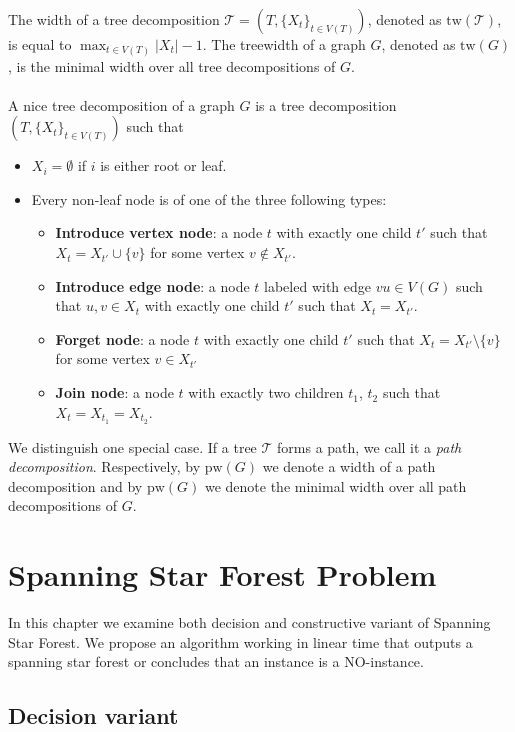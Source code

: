 \documentclass[en]{pracamgr}
\theoremstyle{definition}
\newcommand{\ssf}{spanning star forest}
\newcommand{\ssfp}{{\sc Spanning Star Forest}}
\begin{document}
The width of a tree decomposition $\mathcal{T} = (T,\{X_t\}_{t\in V(T)})$, denoted as $\textrm{tw}(\mathcal{T})$, is equal to $\max_{t \in V(T)} |X_t| - 1$. The treewidth of a graph $G$, denoted as $\textrm{tw}(G)$, is the minimal width over all tree decompositions of $G$.
\\\\
A nice tree decomposition of a graph $G$ is a tree decomposition $(T, \{X_t\}_{t \in V(T)})$ such that
\begin{itemize}
	\item $X_i = \emptyset$ if $i$ is either root or leaf.
	\item Every non-leaf node is of one of the three following types:
	\begin{itemize}
		\item \textbf{Introduce vertex node}: a node $t$ with exactly one child $t'$ such that $X_t = X_{t'} \cup \{v\}$ for some vertex $v \notin X_{t'}$.
		\item \textbf{Introduce edge node}: a node $t$ labeled with edge $vu \in V(G)$ such that $u,v \in X_t$ with exactly one child $t'$ such that $X_t = X_{t'}$.
		\item \textbf{Forget node}: a node $t$ with exactly one child $t'$ such that $X_t = X_{t'} \setminus \{v\}$ for some vertex $v \in X_{t'}$
		\item \textbf{Join node}: a node $t$ with exactly two children $t_1$, $t_2$ such that $X_t = X_{t_1} = X_{t_2}$.
	\end{itemize}
\end{itemize}

We distinguish one special case. If a tree $\mathcal{T}$ forms a path, we call it a \emph{path decomposition}. Respectively, by $\textrm{pw}(G)$ we denote a width of a path decomposition and by $\textrm{pw}(G)$ we denote the minimal width over all path decompositions of $G$.

\chapter{Spanning Star Forest Problem}

In this chapter we examine both decision and constructive variant of \ssfp{}. We propose an algorithm working in linear time that outputs a \ssf{} or concludes that an instance is a NO-instance.

\section{Decision variant}
\end{document}
